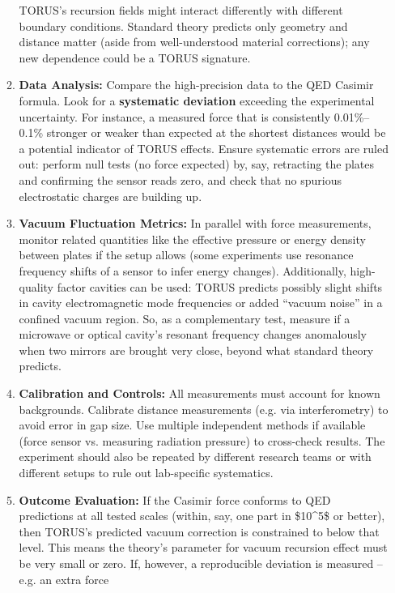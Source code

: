\documentclass[]{article}
\begin{document}
\begin{itemize}
\begin{enumerate}
    TORUS's recursion fields might interact differently with different
    boundary conditions​. Standard theory predicts only geometry and
    distance matter (aside from well-understood material corrections);
    any new dependence could be a TORUS signature.
  \item
    \textbf{Data Analysis:} Compare the high-precision data to the QED
    Casimir formula. Look for a \textbf{systematic deviation} exceeding
    the experimental uncertainty. For instance, a measured force that is
    consistently 0.01\%--0.1\% stronger or weaker than expected at the
    shortest distances would be a potential indicator of TORUS effects​.
    Ensure systematic errors are ruled out: perform null tests (no force
    expected) by, say, retracting the plates and confirming the sensor
    reads zero, and check that no spurious electrostatic charges are
    building up.
  \item
    \textbf{Vacuum Fluctuation Metrics:} In parallel with force
    measurements, monitor related quantities like the effective pressure
    or energy density between plates if the setup allows (some
    experiments use resonance frequency shifts of a sensor to infer
    energy changes). Additionally, high-quality factor cavities can be
    used: TORUS predicts possibly slight shifts in cavity
    electromagnetic mode frequencies or added ``vacuum noise'' in a
    confined vacuum region​. So, as a complementary test, measure if a
    microwave or optical cavity's resonant frequency changes anomalously
    when two mirrors are brought very close, beyond what standard theory
    predicts.
  \item
    \textbf{Calibration and Controls:} All measurements must account for
    known backgrounds. Calibrate distance measurements (e.g. via
    interferometry) to avoid error in gap size. Use multiple independent
    methods if available (force sensor vs. measuring radiation pressure)
    to cross-check results. The experiment should also be repeated by
    different research teams or with different setups to rule out
    lab-specific systematics.
  \item
    \textbf{Outcome Evaluation:} If the Casimir force conforms to QED
    predictions at all tested scales (within, say, one part in
    \$10\^{}5\$ or better), then TORUS's predicted vacuum correction is
    constrained to below that level​. This means the theory's parameter
    for vacuum recursion effect must be very small or zero. If, however,
    a reproducible deviation is measured -- e.g. an extra force

\end{enumerate}
\end{itemize}
\end{document}
